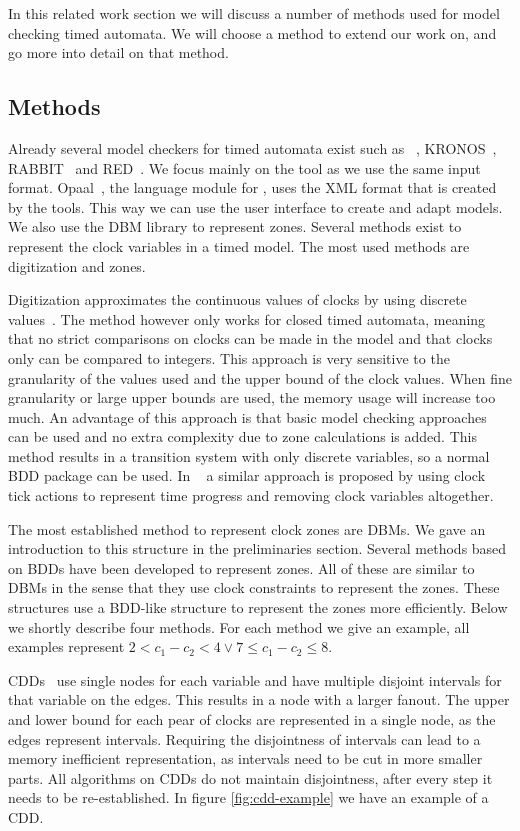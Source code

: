 In this related work section we will discuss a number of methods used for model checking timed automata. We will choose a method to extend our work on, and go more into detail on that method.

\subsection{Methods}
Already several model checkers for timed automata exist such as \uppaal{}~\cite{UPPAAL}, KRONOS~\cite{kronos}, RABBIT~\cite{CAV03} and RED~\cite{crds}. We focus mainly on the \uppaal{} tool as we use the same input format. Opaal~\cite{opaal}, the language module for \ltsmin{}, uses the XML format that is created by the \uppaal{} tools. This way we can use the \uppaal{} user interface to create and adapt models. We also use the \uppaal{} DBM library to represent zones. Several methods exist to represent the clock variables in a timed model. The most used methods are digitization and zones. 

Digitization approximates the continuous values of clocks by using discrete values~\cite{CHARME01}. The method however only works for closed timed automata, meaning that no strict comparisons on clocks can be made in the model and that clocks only can be compared to integers. This approach is very sensitive to the granularity of the values used and the upper bound of the clock values. When fine granularity or large upper bounds are used, the memory usage will increase too much. An advantage of this approach is that basic model checking approaches can be used and no extra complexity due to zone calculations is added. This method results in a transition system with only discrete variables, so a normal BDD package can be used. In ~\cite{nguyen2012discrete} a similar approach is proposed by using clock tick actions to represent time progress and removing clock variables altogether. 

The most established method to represent clock zones are DBMs. We gave an introduction to this structure in the preliminaries section. Several methods based on BDDs have been developed to represent zones. All of these are similar to DBMs in the sense that they use clock constraints to represent the zones. These structures use a BDD-like structure to represent the zones more efficiently. Below we shortly describe four methods. For each method we give an example, all examples represent $2 < c_1 - c_2 < 4 \vee 7 \leq c_1 - c_2 \leq 8$.

CDDs~\cite{BRICS19491} use single nodes for each variable and have multiple disjoint intervals for that variable on the edges. This results in a node with a larger fanout. The upper and lower bound for each pear of clocks are represented in a single node, as the edges represent intervals. Requiring the disjointness of intervals can lead to a memory inefficient representation, as intervals need to be cut in more smaller parts. All algorithms on CDDs do not maintain disjointness, after every step it needs to be re-established. In figure \ref{fig:cdd-example} we have an example of a CDD.

